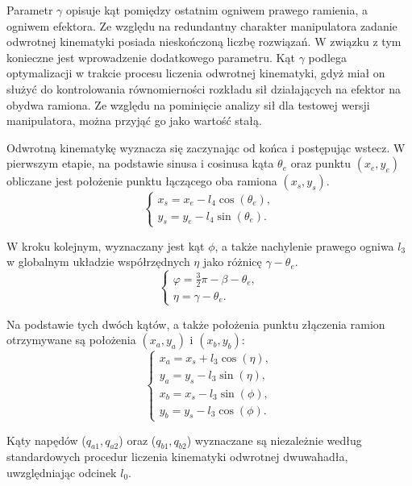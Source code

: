 \documentclass[printmode]{mgr}
\begin{document}
Parametr $\gamma$ opisuje kąt pomiędzy ostatnim ogniwem prawego ramienia, a ogniwem efektora. Ze względu na redundantny charakter manipulatora
zadanie odwrotnej kinematyki posiada nieskończoną liczbę rozwiązań. W związku z tym konieczne jest wprowadzenie dodatkowego parametru.
Kąt $\gamma$ podlega optymalizacji w trakcie procesu liczenia odwrotnej kinematyki, gdyż miał on służyć do kontrolowania równomierności
rozkładu sił działających na efektor na obydwa ramiona. Ze względu na pominięcie analizy sił dla testowej wersji manipulatora, można
przyjąć go jako wartość stałą.

Odwrotną kinematykę wyznacza się zaczynając od końca i postępując wstecz. W pierwszym etapie, na podstawie sinusa i cosinusa kąta
$\theta_e$ oraz punktu $(x_e, y_e)$ obliczane jest położenie punktu łączącego oba ramiona $(x_s, y_s)$. 
\begin{equation}
\begin{cases}
x_s = x_e - l_4\cos(\theta_e),\\
y_s = y_e - l_4\sin(\theta_e).
\end{cases}
\label{eq:testowa_kinematyka_odwrotna2}
\end{equation}

W kroku kolejnym, 
wyznaczany jest kąt $\phi$, a także nachylenie prawego ogniwa $l_3$ w globalnym
układzie współrzędnych $\eta$ jako różnicę $\gamma - \theta_e$. 
\begin{equation}
\begin{cases}
\varphi = \frac{3}{2}\pi - \beta - \theta_e,\\
\eta = \gamma - \theta_e.
\end{cases}
\label{eq:testowa_kinematyka_odwrotna3}
\end{equation}

Na podstawie tych dwóch kątów, a także położenia punktu złączenia ramion
otrzymywane są położenia $(x_a, y_a)$ i $(x_b, y_b)$:
\begin{equation}
\begin{cases}
x_a = x_s + l_3\cos(\eta),\\
y_a = y_s - l_3\sin(\eta),\\
x_b = x_s - l_3\sin(\phi),\\
y_b = y_s - l_3\cos(\phi).
\end{cases}
\label{eq:testowa_kinematyka_odwrotna4}
\end{equation}

Kąty napędów ($q_{a1}, q_{a2}$) oraz ($q_{b1}, q_{b2}$)
wyznaczane są niezależnie według standardowych procedur liczenia kinematyki odwrotnej dwuwahadła, uwzględniając odcinek $l_0$.
\end{document}
